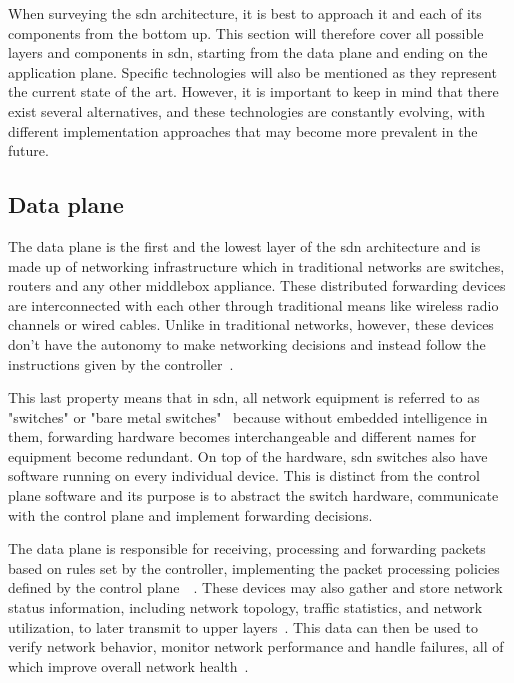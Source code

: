 When surveying the \gls{sdn} architecture, it is best to approach it and each of its components from the bottom up. This section will therefore cover all possible layers and components in \gls{sdn}, starting from the data plane and ending on the application plane. Specific technologies will also be mentioned as they represent the current state of the art. However, it is important to keep in mind that there exist several alternatives, and these technologies are constantly evolving, with different implementation approaches that may become more prevalent in the future. 



\subsection{Data plane} %

The data plane is the first and the lowest layer of the \gls{sdn} architecture and is made up of networking infrastructure which in traditional networks are switches, routers and any other middlebox appliance. These distributed forwarding devices are interconnected with each other through traditional means like wireless radio channels or wired cables. Unlike in traditional networks, however, these devices don't have the autonomy to make networking decisions and instead follow the instructions given by the controller~\cite{kreutz_software-defined_2015}. 

This last property means that in \gls{sdn}, all network equipment is referred to as "switches" or "bare metal switches"~\cite{peterson_software-defined_2021} because without embedded intelligence in them, forwarding hardware becomes interchangeable and different names for equipment become redundant. On top of the hardware, \gls{sdn} switches also have software running on every individual device. This is distinct from the control plane software and its purpose is to abstract the switch hardware, communicate with the control plane and implement forwarding decisions. 

The data plane is responsible for receiving, processing and forwarding packets based on rules set by the controller, implementing the packet processing policies defined by the control plane~\cite{mckeown_openflow_2008}~\cite{xia_survey_2015}. These devices may also gather and store network status information, including network topology, traffic statistics, and network utilization, to later transmit to upper layers~\cite{xia_survey_2015}. This data can then be used to verify network behavior, monitor network performance and handle failures, all of which improve overall network health~\cite{bifulco_survey_2018}.

